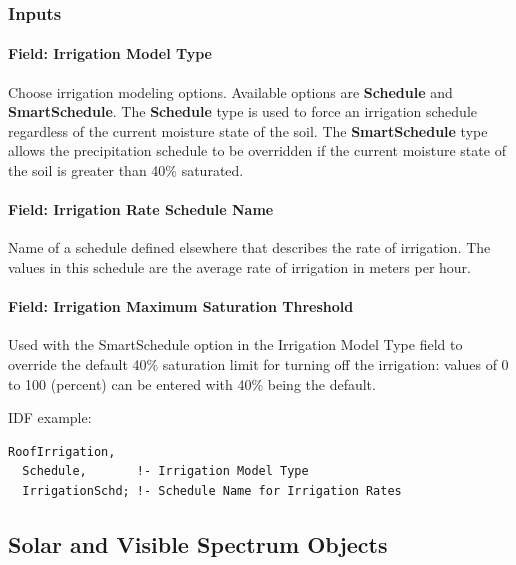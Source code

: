 \subsubsection{Inputs}\label{inputs-23-002}

\paragraph{Field: Irrigation Model Type}\label{field-irrigation-model-type}

Choose irrigation modeling options. Available options are \textbf{Schedule} and \textbf{SmartSchedule}. The \textbf{Schedule} type is used to force an irrigation schedule regardless of the current moisture state of the soil. The \textbf{SmartSchedule} type allows the precipitation schedule to be overridden if the current moisture state of the soil is greater than 40\% saturated.

\paragraph{Field: Irrigation Rate Schedule Name}\label{field-irrigation-rate-schedule-name}

Name of a schedule defined elsewhere that describes the rate of irrigation. The values in this schedule are the average rate of irrigation in meters per hour.

\paragraph{Field: Irrigation Maximum Saturation Threshold}\label{field-irrigation-maximum-saturation-threshold}

Used with the SmartSchedule option in the Irrigation Model Type field to override the default 40\% saturation limit for turning off the irrigation: values of 0 to 100 (percent) can be entered with 40\% being the default.

IDF example:

\begin{lstlisting}
RoofIrrigation,
  Schedule,       !- Irrigation Model Type
  IrrigationSchd; !- Schedule Name for Irrigation Rates
\end{lstlisting}

\subsection{Solar and Visible Spectrum Objects}\label{solar-and-visible-spectrum-objects}

